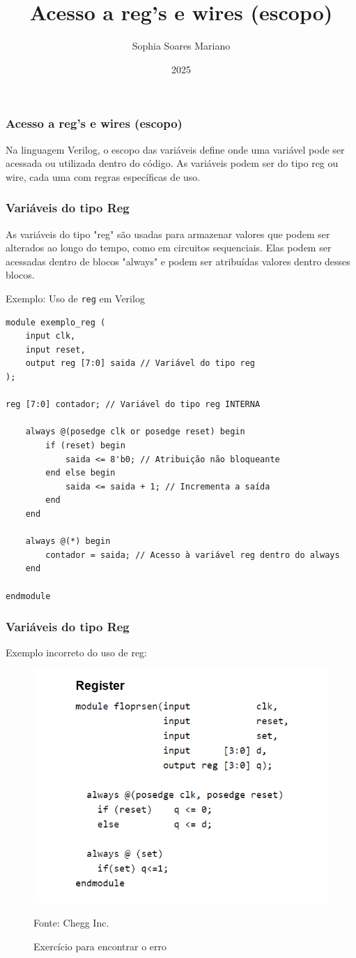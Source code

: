 \documentclass{beamer}
\title{Acesso a reg's e wires (escopo)}
\author{Sophia Soares Mariano}
\institute{Poliware}
\date{2025}
\begin{document}
\frame{\titlepage}

\begin{frame}
\frametitle{Acesso a reg's e wires (escopo)}
Na linguagem Verilog, o escopo das variáveis define onde uma variável pode ser acessada ou utilizada dentro do código. As variáveis podem ser do tipo reg ou wire, cada uma com regras específicas de uso.
\end{frame}

\begin{frame}
\frametitle{Variáveis do tipo Reg}

As variáveis do tipo "reg" são usadas para armazenar valores que podem ser alterados ao longo do tempo, como em circuitos sequenciais. 
Elas podem ser acessadas dentro de blocos "always" e podem ser atribuídas valores dentro desses blocos. 
\end{frame}

\begin{frame}[fragile]{Exemplo: Uso de \texttt{reg} em Verilog}
\small
\begin{verbatim}
module exemplo_reg (
    input clk,
    input reset,
    output reg [7:0] saida // Variável do tipo reg
);

reg [7:0] contador; // Variável do tipo reg INTERNA

    always @(posedge clk or posedge reset) begin
        if (reset) begin
            saida <= 8'b0; // Atribuição não bloqueante
        end else begin
            saida <= saida + 1; // Incrementa a saída
        end
    end

    always @(*) begin
        contador = saida; // Acesso à variável reg dentro do always
    end

endmodule
\end{verbatim}
\end{frame}

\begin{frame}
\frametitle{Variáveis do tipo Reg}

Exemplo incorreto do uso de reg:
\begin{figure}
    \centering
    \includegraphics[width=0.5\linewidth]{reg.png}
    \caption{Exercício para encontrar o erro}
    Fonte: Chegg Inc.
    \label{fig:enter-label}
\end{figure}
\end{frame}
\end{document}
